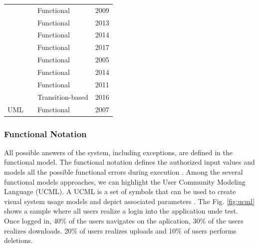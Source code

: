 \documentclass[espaco=umemeio,chapter=TITLE,twoside,openright]{abnt}
\begin{document}
\begin{table}[h]
\begin{tabular}{|l|l|l|l|}
                                        & \cite{Rauf2009}         & Functional           & 2009          \\ \cline{2-4}
                                        & \cite{Schaefer2013}     & Functional           & 2013          \\ \cline{2-4}
                                        & \cite{Paper2014}        & Functional           & 2014          \\ \cline{2-4}
                                        & 
\cite{moscher2017facing}        & Functional           & 2017          \\ \cline{2-4}
                                        & \cite{Kim2005}          & Functional           & 2005          \\ \cline{2-4}
                                        & \cite{Rodrigues2014}    & Functional           & 2014          \\ \cline{2-4}
                                        & \begin{minipage}{0.4\textwidth}\cite{Silveira2011}\end{minipage}     & Functional           & 2011          \\ \cline{2-4}
                                        &
\cite{Vogele2016}    & Transition-based      & 2016          \\ \cline{2-4}


\multirow{-9}{*}{UML}                   & \begin{minipage}{0.4\textwidth}\cite{Lenz2007}\end{minipage}         & Functional           & 2007          \\ \hline
\end{tabular}
\end{table}


\subsubsection{Functional Notation}

All possible answers of the system, including exceptions, are defined in the functional
model.  The functional notation defines the authorized input values and models all the possible functional errors during execution \cite{utting2010practical}. Among the several functional models approaches, we can highlight the User Community Modeling Language (UCML). A UCML is a set of symbols that can be used to create visual system usage models and depict associated parameters \cite{Wang2013}. The Fig. \ref{fig:ucml} shows a sample where all users realize a login into the application unde test. Once logged in, 40\% of the users navigates on the aplication, 30\%  of the users realizes downloads. 20\% of users realizes uploads and 10\% of users performs deletions. 
\end{document}
